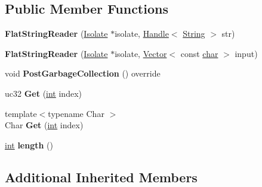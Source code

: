 \subsection*{Public Member Functions}
\begin{DoxyCompactItemize}
\item 
\mbox{\label{classv8_1_1internal_1_1FlatStringReader_ae2b7accc58c68221f7b45520b544cd64}} 
{\bfseries Flat\+String\+Reader} (\mbox{\hyperlink{classv8_1_1internal_1_1Isolate}{Isolate}} $\ast$isolate, \mbox{\hyperlink{classv8_1_1internal_1_1Handle}{Handle}}$<$ \mbox{\hyperlink{classv8_1_1internal_1_1String}{String}} $>$ str)
\item 
\mbox{\label{classv8_1_1internal_1_1FlatStringReader_af3203553f086dd868b51f25b8bddbbcb}} 
{\bfseries Flat\+String\+Reader} (\mbox{\hyperlink{classv8_1_1internal_1_1Isolate}{Isolate}} $\ast$isolate, \mbox{\hyperlink{classv8_1_1internal_1_1Vector}{Vector}}$<$ const \mbox{\hyperlink{classchar}{char}} $>$ input)
\item 
\mbox{\label{classv8_1_1internal_1_1FlatStringReader_a886e49d92964c5676b8e251dd9c871c4}} 
void {\bfseries Post\+Garbage\+Collection} () override
\item 
\mbox{\label{classv8_1_1internal_1_1FlatStringReader_a7499abcea8aef7a95d961141a1219db9}} 
uc32 {\bfseries Get} (\mbox{\hyperlink{classint}{int}} index)
\item 
\mbox{\label{classv8_1_1internal_1_1FlatStringReader_a04cb3a9f7a8b8ab35f310eab0895f97c}} 
{\footnotesize template$<$typename Char $>$ }\\Char {\bfseries Get} (\mbox{\hyperlink{classint}{int}} index)
\item 
\mbox{\label{classv8_1_1internal_1_1FlatStringReader_af402065726c67b6223a3f09df2156a45}} 
\mbox{\hyperlink{classint}{int}} {\bfseries length} ()
\end{DoxyCompactItemize}
\subsection*{Additional Inherited Members}


